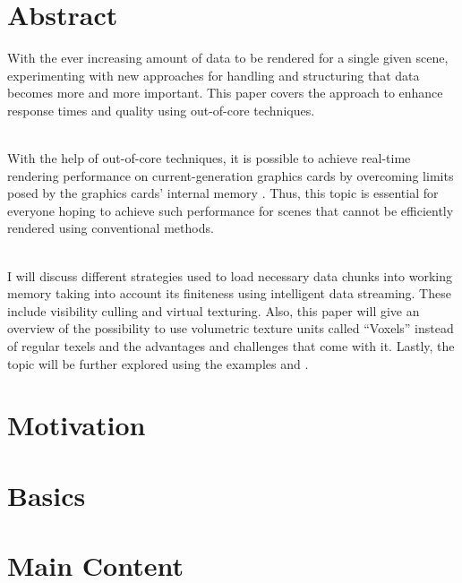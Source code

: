 
\chapter{Abstract}
\label{ch:Abstract}

With the ever increasing amount of data to be rendered for a single given scene, experimenting with new approaches for handling and structuring that data becomes more and more important. This paper covers the approach to enhance response times and quality using out-of-core techniques. 

\\

With the help of out-of-core techniques, it is possible to achieve real-time rendering performance on current-generation graphics cards by overcoming limits posed by the graphics cards' internal memory \cite{Crassin:2009:GRS:1507149.1507152}. Thus, this topic is essential for everyone hoping to achieve such performance for scenes that cannot be efficiently rendered using conventional methods.

\\

I will discuss different strategies used to load necessary data chunks into working memory taking into account its finiteness using intelligent data streaming. These include visibility culling and virtual texturing. Also, this paper will give an overview of the possibility to use volumetric texture units called ``Voxels'' instead of regular texels and the advantages and challenges that come with it. Lastly, the topic will be further explored using the examples \cite{Crassin:2009:GRS:1507149.1507152} and \cite{van2009id}.
%



\chapter{Motivation}
\label{ch:Motivation}

\chapter{Basics}
\label{ch:Basics}


\chapter{Main Content}
\label{ch:MainContent}

